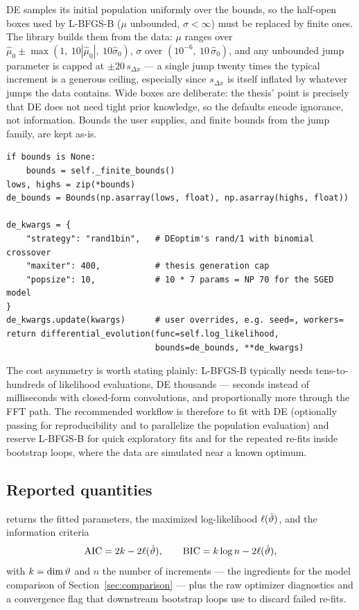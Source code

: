 \begin{decision}
\label{dec:finite-bounds}
DE samples its initial population uniformly over the bounds, so the
half-open boxes used by L-BFGS-B ($\mu$ unbounded, $\sigma < \infty$)
must be replaced by finite ones. The library builds them from the data:
$\mu$ ranges over $\hat\mu_0 \pm \max(1,\ 10|\hat\mu_0|,\ 10\hat\sigma_0)$,
$\sigma$ over $(10^{-6},\ 10\,\hat\sigma_0)$, and any unbounded jump
parameter is capped at $\pm 20\, s_{\Delta x}$ --- a single jump twenty
times the typical increment is a generous ceiling, especially since
$s_{\Delta x}$ is itself inflated by whatever jumps the data contains.
Wide boxes are deliberate: the thesis' point is precisely that DE does
not need tight prior knowledge, so the defaults encode ignorance, not
information. Bounds the user supplies, and finite bounds from the jump
family, are kept as-is.
\end{decision}

\begin{lstlisting}[caption={DE configuration in \code{estimation/maximum\_likelihood.py} (excerpt).}]
if bounds is None:
    bounds = self._finite_bounds()
lows, highs = zip(*bounds)
de_bounds = Bounds(np.asarray(lows, float), np.asarray(highs, float))

de_kwargs = {
    "strategy": "rand1bin",   # DEoptim's rand/1 with binomial crossover
    "maxiter": 400,           # thesis generation cap
    "popsize": 10,            # 10 * 7 params = NP 70 for the SGED model
}
de_kwargs.update(kwargs)      # user overrides, e.g. seed=, workers=
return differential_evolution(func=self.log_likelihood,
                              bounds=de_bounds, **de_kwargs)
\end{lstlisting}

The cost asymmetry is worth stating plainly: L-BFGS-B typically needs
tens-to-hundreds of likelihood evaluations, DE thousands --- seconds
instead of milliseconds with closed-form convolutions, and proportionally
more through the FFT path. The recommended workflow is therefore to fit
with DE (optionally passing  for reproducibility and
 to parallelize the population evaluation) and reserve
L-BFGS-B for quick exploratory fits and for the repeated re-fits inside
bootstrap loops, where the data are simulated near a known optimum.

\subsection{Reported quantities}

 returns the fitted parameters, the maximized
log-likelihood $\ell(\hat{\vartheta})$, and the information criteria
\begin{equation}
  \mathrm{AIC} = 2k - 2\ell(\hat{\vartheta}),
  \qquad
  \mathrm{BIC} = k \log n - 2\ell(\hat{\vartheta}),
  \label{eq:aic-bic}
\end{equation}
with $k = \dim\vartheta$ and $n$ the number of increments --- the
ingredients for the model comparison of Section~\ref{sec:comparison} ---
plus the raw optimizer diagnostics and a convergence flag that downstream
bootstrap loops use to discard failed re-fits.
